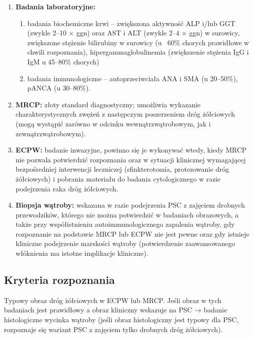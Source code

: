 \begin{enumerate}
    \item \textbf{Badania laboratoryjne:}
    
    \begin{enumerate}
        \item badania biochemiczne krwi – zwiększona aktywność ALP i/lub GGT (zwykle 2–10 × ggn) oraz AST i ALT (zwykle 2–4 × ggn) w surowicy, zwiększone stężenie bilirubiny w surowicy (u ~60\% chorych prawidłowe w chwili rozpoznania), hipergammaglobulinemia (zwiększenie stężenia IgG i IgM u 45–80\% chorych)

    \item badania immunologiczne – autoprzeciwciała ANA i SMA (u 20–50\%), pANCA (u 30–80\%).
\end{enumerate}

    \item \textbf{MRCP:} złoty standard diagnostyczny; umożliwia wykazanie charakterystycznych zwężeń z następczym poszerzeniem dróg żółciowych (mogą wystąpić zarówno w odcinku wewnątrzwątrobowym, jak i zewnątrzwątrobowym).
    
    \item \textbf{ECPW:} badanie inwazyjne, powinno się je wykonywać wtedy, kiedy MRCP nie pozwala potwierdzić rozpoznania oraz w sytuacji klinicznej wymagającej bezpośredniej interwencji leczniczej (sfinkterotomia, protezowanie dróg żółciowych) i pobrania materiału do badania cytologicznego w razie podejrzenia raka dróg żółciowych.
    
    \item \textbf{Biopsja wątroby:} wskazana w razie podejrzenia PSC z zajęciem drobnych przewodzików, którego nie można potwierdzić w badaniach obrazowych, a także przy współistnieniu autoimmunologicznego zapalenia wątroby, gdy rozpoznanie na podstawie MRCP lub ECPW nie jest pewne oraz gdy istnieje kliniczne podejrzenie marskości wątroby (potwierdzenie zaawansowanego włóknienia ma istotne implikacje kliniczne).
\end{enumerate}

\subsection{Kryteria rozpoznania}

Typowy obraz dróg żółciowych w ECPW lub MRCP. 
Jeśli obraz w tych badaniach jest prawidłowy a obraz kliniczny wskazuje na PSC → badanie histologiczne wycinka wątroby (jeśli obraz histologiczny jest typowy dla PSC, rozpoznaje się wariant PSC z zajęciem tylko drobnych dróg żółciowych).

